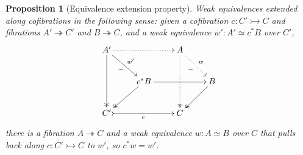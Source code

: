 \documentclass[11pt]{amsart}
\newcommand{\mono}{\ensuremath{\rightarrowtail}}
\newcommand{\onto}{\ensuremath{\twoheadrightarrow}}
\newtheorem{proposition}[theorem]{Proposition}
\theoremstyle{remark}
\theoremstyle{definition}
\begin{document}
\begin{proposition}[Equivalence extension property]\label{prop:EEP}
Weak equivalences extended along cofibrations in the following sense: given a cofibration $c:C' \mono C$ and fibrations $A'\onto C'$ and $B\onto C$, and a weak equivalence $w':A' \simeq c^*B$ over $C'$,
\begin{equation}\label{diag:EEP}
\xymatrix{
A' \ar@{->>}[dd] \ar[rd]_{\sim}^{w'} \ar@{..>}[rr] && A \ar@{..>>}[dd] \ar@{..>}[rd]_{\sim}^{w} \\
& c^*B \ar@{->>}[ld] \ar[rr]  && B \ar@{->>}[ld] \\
C' \ar@{>->}[rr]_c && C
}
\end{equation}
there is a fibration $A\onto C$ and a weak equivalence $w: A \simeq B$ over $C$ that pulls back along $c:C' \mono C$ to $w'$, so $c^*w = w'$.

\end{proposition}
%
\end{document}
